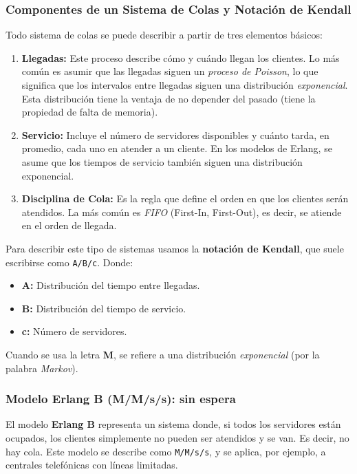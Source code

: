 \documentclass{article}
\begin{document}
\subsubsection*{Componentes de un Sistema de Colas y Notación de Kendall}

Todo sistema de colas se puede describir a partir de tres elementos básicos:

\begin{enumerate}
    \item \textbf{Llegadas:} Este proceso describe cómo y cuándo llegan los clientes. Lo más común es asumir que las llegadas siguen un \textit{proceso de Poisson}, lo que significa que los intervalos entre llegadas siguen una distribución \textit{exponencial}. Esta distribución tiene la ventaja de no depender del pasado (tiene la propiedad de falta de memoria).

    \item \textbf{Servicio:} Incluye el número de servidores disponibles y cuánto tarda, en promedio, cada uno en atender a un cliente. En los modelos de Erlang, se asume que los tiempos de servicio también siguen una distribución exponencial.

    \item \textbf{Disciplina de Cola:} Es la regla que define el orden en que los clientes serán atendidos. La más común es \textit{FIFO} (First-In, First-Out), es decir, se atiende en el orden de llegada.
\end{enumerate}

Para describir este tipo de sistemas usamos la \textbf{notación de Kendall}, que suele escribirse como \texttt{A/B/c}. Donde:

\begin{itemize}
    \item \textbf{A:} Distribución del tiempo entre llegadas.
    \item \textbf{B:} Distribución del tiempo de servicio.
    \item \textbf{c:} Número de servidores.
\end{itemize}

Cuando se usa la letra \textbf{M}, se refiere a una distribución \textit{exponencial} (por la palabra \textit{Markov}).

\subsubsection*{Modelo Erlang B (M/M/s/s): sin espera}

El modelo \textbf{Erlang B} representa un sistema donde, si todos los servidores están ocupados, los clientes simplemente no pueden ser atendidos y se van. Es decir, no hay cola. Este modelo se describe como \texttt{M/M/s/s}, y se aplica, por ejemplo, a centrales telefónicas con líneas limitadas.
\end{document}
